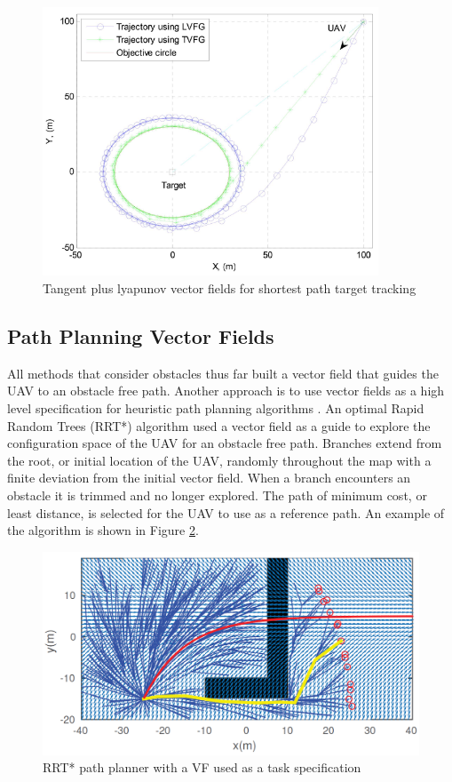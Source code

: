 \documentclass[numbered,pdftex]{ohio-etd}
\begin{document}
\begin{figure}
	\centering
	\includegraphics[width=10cm]{PaperFigures/lyapunovChen}
	\caption{Tangent plus lyapunov vector fields for shortest path target tracking \cite{chen_uav_2013}}
	\label{fig:lyapunovChen}
\end{figure}


\subsection{Path Planning Vector Fields}
All methods that consider obstacles thus far built a vector field that guides the UAV to an obstacle free path. Another approach is to use vector fields as a high level specification for heuristic path planning algorithms \cite{pereira_framework_2016}. An optimal Rapid Random Trees (RRT*) algorithm used a vector field as a guide to explore the configuration space of the UAV for an obstacle free path. Branches extend from the root, or initial location of the UAV, randomly throughout the map with a finite deviation from the initial vector field. When a branch encounters an obstacle it is trimmed and no longer explored. The path of minimum cost, or least distance, is selected for the UAV to use as a reference path. An example of the algorithm is shown in Figure \ref{fig:rrtvf}.

\begin{figure}[H]
	\centering
	\includegraphics[width=12cm]{PaperFigures/rrtVF}
	\caption{RRT* path planner with a VF used as a task specification \cite{pereira_framework_2016}}
	\label{fig:rrtvf}
\end{figure}
\end{document}
